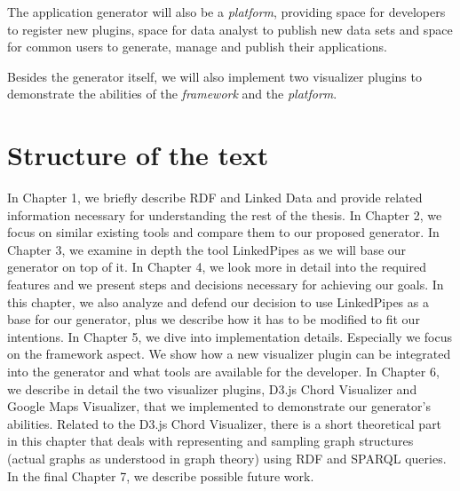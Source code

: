 The application generator will also be a \textit{platform}, providing space for developers to register new plugins, space for data analyst to publish new data sets and space for common users to generate, manage and publish their applications.

Besides the generator itself, we will also implement two visualizer plugins to demonstrate the abilities of the \textit{framework} and the \textit{platform}.

\section*{Structure of the text}

In Chapter 1, we briefly describe RDF and Linked Data and provide related information necessary for understanding the rest of the thesis. In Chapter 2, we focus on similar existing tools and compare them to our proposed generator. In Chapter 3, we examine in depth the tool LinkedPipes as we will base our generator on top of it.  In Chapter 4, we look more in detail into the required features and we present steps and decisions necessary for achieving our goals. In this chapter, we also analyze and defend our decision to use LinkedPipes as a base for our generator, plus we describe how it has to be modified to fit our intentions. In Chapter 5, we dive into implementation details. Especially we focus on the framework aspect. We show how a new visualizer plugin can be integrated into the generator and what tools are available for the developer. In Chapter 6, we describe in detail the two visualizer plugins, D3.js Chord Visualizer and Google Maps Visualizer, that we implemented to demonstrate our generator's abilities. Related to the D3.js Chord Visualizer, there is a short theoretical part in this chapter that deals with representing and sampling graph structures (actual graphs as understood in graph theory) using RDF and SPARQL queries. In the final Chapter 7, we describe possible future work.